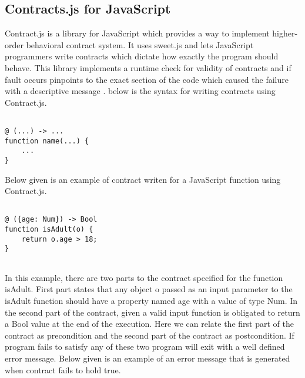 \subsection{Contracts.js for JavaScript}

Contract.js is a library for JavaScript which provides a way to implement higher-order behavioral contract system. It uses sweet.js and lets JavaScript programmers write contracts which dictate how exactly the program should behave. This library implements a runtime check for validity of contracts and if fault occurs pinpoints to the exact section of the code which caused the failure with a descriptive message \cite{Contract11:online}.
below is the syntax for writing contracts using Contract.js. \linebreak


\begin{minipage}{\linewidth}
\lstset{language=Java, caption=Contract.js syntax , captionpos=b, breaklines=true}       
\begin{lstlisting}[frame=single]

@ (...) -> ...
function name(...) {
    ...
}
\end{lstlisting}
\end{minipage}

Below given is an example of contract writen for a JavaScript function using Contract.js. \linebreak


\begin{minipage}{\linewidth}
\lstset{language=Java, caption=Contract using Contract.js, captionpos=b, breaklines=true}       
\begin{lstlisting}[frame=single]

@ ({age: Num}) -> Bool
function isAdult(o) {
    return o.age > 18;
}
    
\end{lstlisting}
\end{minipage}

In this example, there are two parts to the contract specified for the function isAdult. First part states that any object o passed as an input parameter to the isAdult function should have a property named age with a value of type Num. In the second part of the contract, given a valid input function is obligated to return a Bool value at the end of the execution. Here we can relate the first part of the contract as precondition and the second part of the contract as postcondition. If program fails to satisfy any of these two program will exit with a well defined error message. Below given is an example of an error message that is generated when contract fails to hold true.
\linebreak

